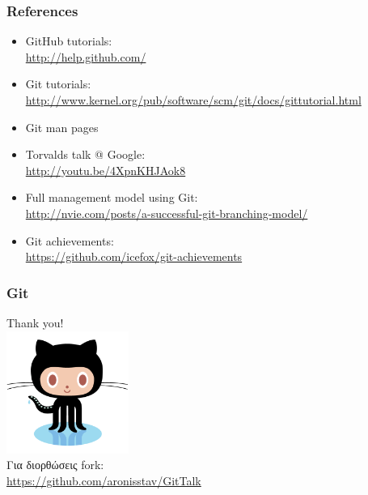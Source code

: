 \documentclass[handout]{beamer}
\begin{document}
\begin{frame}
  \frametitle{References}
  \begin{itemize}
    \item GitHub tutorials: \\
      \url{http://help.github.com/}
    \item Git tutorials: \\
      \url{http://www.kernel.org/pub/software/scm/git/docs/gittutorial.html}
    \item Git man pages
    \item Torvalds talk @ Google: \\
      \url{http://youtu.be/4XpnKHJAok8}
    \item Full management model using Git: \\
      \url{http://nvie.com/posts/a-successful-git-branching-model/}
    \item Git achievements: \\
      \url{https://github.com/icefox/git-achievements}
  \end{itemize}
\end{frame}

\begin{frame}
  \frametitle{Git}
    \begin{center}
      Thank you! \\
      \includegraphics[height=4cm]{Octocat.png} \\
      \small{Για διορθώσεις fork:
        \\ \url{https://github.com/aronisstav/GitTalk}}

    \end{center}
\end{frame}
\end{document}
